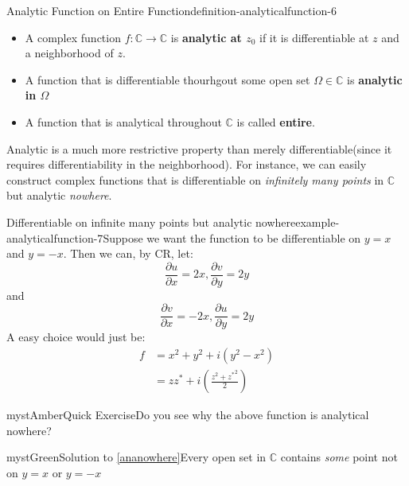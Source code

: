 \begin{mystthmdefinition}{Analytic Function on Entire Function}{definition-analyticalfunction-6}\begin{itemize}
\item A complex function $f:\mathbb{C} \to \mathbb{C}$ is \textbf{analytic at $z_0$} if it is differentiable at $z$ and a neighborhood of $z$.
\item A function that is differentiable thourhgout some open set $\Omega \in \mathbb{C}$ is \textbf{analytic in $\Omega$}
\item A function that is analytical throughout $\mathbb{C}$ is called \textbf{entire}.
\end{itemize}

\end{mystthmdefinition}
Analytic is a much more restrictive property than merely differentiable(since it requires differentiability in the neighborhood). For instance, we can easily construct complex functions that is differentiable on \textit{infinitely many points} in $\mathbb{C}$ but analytic \textit{nowhere}.

\begin{mystthmexample}{Differentiable on infinite many points but analytic nowhere}{example-analyticalfunction-7}Suppose we want the function to be differentiable on $y=x$ and $y= -x$. Then we can, by CR, let:
\begin{equation}
\frac{\partial u}{\partial x} =2x, \frac{\partial v}{\partial y} = 2y
\end{equation}
and
\begin{equation}
\frac{\partial v}{\partial x} =-2x, \frac{\partial u}{\partial y} = 2y
\end{equation}
A easy choice would just be:
\begin{equation}
\begin{aligned}
f&=x^2+y^2 +i(y^2-x^2) \\
&= zz^*+i\left(\frac{z^2+{z^*}^2}{2}\right)
\end{aligned}
\end{equation}

\end{mystthmexample}
\begin{mystadmonition}{mystAmber}{Quick Exercise}\label{ananowhere}Do you see why the above function is analytical nowhere?

\end{mystadmonition}
\begin{mystadmonition}{mystGreen}{Solution to \ref{ananowhere}}Every open set in $\mathbb{C}$ contains \textit{some} point not on $y=x$ or $y= -x$

\end{mystadmonition}